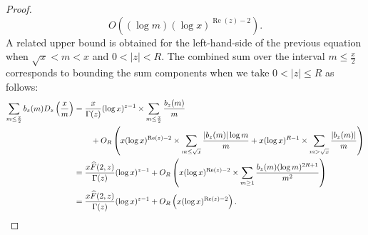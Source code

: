 \documentclass[11pt,reqno,a4letter]{article}
\numberwithin{figure}{section}
\numberwithin{table}{section}
\theoremstyle{plain}
\numberwithin{theorem}{section}
\theoremstyle{definition}
\renewcommand{\Re}{\operatorname{Re}}
\begin{document}
\begin{proof}
\[     O\left((\log m) (\log x)^{\Re(z) - 2}\right). 
\]
A related upper bound is obtained for the left-hand-side of the previous equation when 
$\sqrt{x} < m < x$ and $0 < |z| < R$. 
The combined sum over the interval $m \leq \frac{x}{2}$ corresponds to bounding the 
sum components when we take $0 < |z| \leq R$ as follows: 
\begin{align*} 
\sum_{m \leq \frac{x}{2}} b_z(m) D_z\left(\frac{x}{m}\right) & = \frac{x}{\Gamma(z)} (\log x)^{z-1} \times 
     \sum_{m \leq \frac{x}{2}} \frac{b_z(m)}{m} \\ 
     & \phantom{=\quad\ } + 
     O_R\left(x (\log x)^{\Re(z)-2} \times \sum_{m \leq \sqrt{x}} \frac{|b_z(m)| \log m}{m} + 
     x (\log x)^{R-1} \times \sum_{m > \sqrt{x}} \frac{|b_z(m)|}{m}\right) \\ 
     & = \frac{x \widehat{F}(2, z)}{\Gamma(z)} (\log x)^{z-1} + O_R\left( 
     x (\log x)^{\Re(z)-2} \times \sum_{m \geq 1} \frac{b_z(m) (\log m)^{2R+1}}{m^2} 
     \right) \\ 
     & = \frac{x \widehat{F}(2, z)}{\Gamma(z)} (\log x)^{z-1} + O_{R}\left( 
     x (\log x)^{\Re(z)-2}\right). 
     \qedhere  
\end{align*} 
\end{proof} 
\end{document}
